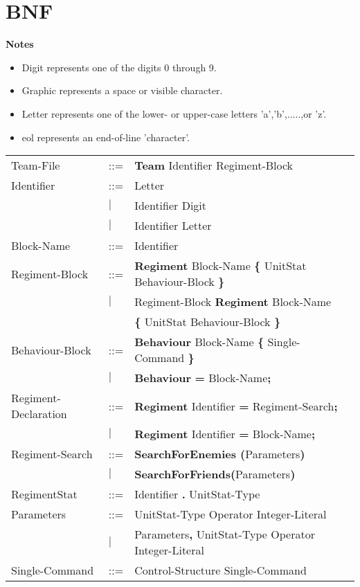 \appendix
\chapter{BNF}
{\bf Notes}
\begin{itemize}
	\item Digit represents one of the digits 0 through 9.
	\item Graphic represents a space or visible character.
	\item Letter represents one of the lower- or upper-case letters 'a','b',.....,or 'z'.
	\item eol represents an end-of-line 'character'.
\end{itemize}
\begin{center}
		\begin{longtable}{l l l}
		\endfirsthead
		\endhead
Team-File					&	::=	&{\bf Team} Identifier Regiment-Block\\
Identifier					&	::=	&Letter\\
							&$\mid$	&Identifier Digit\\
							&$\mid$	&Identifier Letter\\
Block-Name					&	::=	&Identifier\\
Regiment-Block				&	::=	&{\bf Regiment} Block-Name {\bf \{ } UnitStat Behaviour-Block \bf{\} }\\
							&$\mid$	&Regiment-Block {\bf Regiment} Block-Name\\
							&		&{\bf \{ } UnitStat Behaviour-Block \bf{\} }\\
Behaviour-Block				&	::=	&{\bf Behaviour} Block-Name {\bf \{} Single-Command {\bf \}}  \\
							&$\mid$	& {\bf Behaviour} {\bf = } Block-Name{\bf ;} \\
Regiment-Declaration			&	::=	&{\bf Regiment} Identifier {\bf =} Regiment-Search{\bf ;}\\
							&$\mid$	&{\bf Regiment} Identifier {\bf =} Block-Name{\bf ;}\\
Regiment-Search				&	::=	&{\bf SearchForEnemies (}Parameters{\bf)}\\
							&$\mid$	&{\bf SearchForFriends(}Parameters{\bf)}\\
RegimentStat				&	::=	&Identifier {\bf.} UnitStat-Type \\
Parameters					&	::=	&UnitStat-Type Operator Integer-Literal\\
 							&$\mid$	&Parameters{\bf ,} UnitStat-Type Operator Integer-Literal\\
Single-Command				&	::=	&Control-Structure Single-Command \\

\end{longtable}
\end{center}
